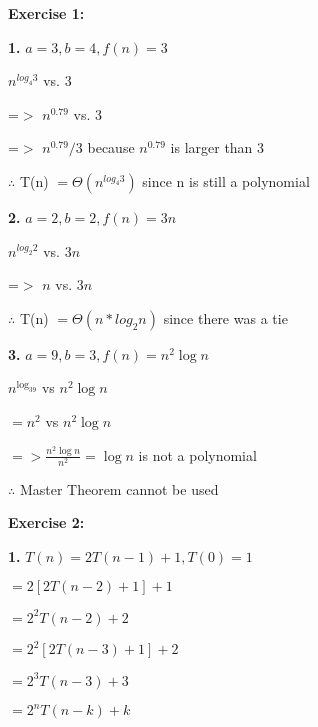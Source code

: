 \documentclass[12pt,letterpaper,final]{report}
\begin{document}
\vline


\noindent\textbf{Exercise 1:}  

\bigskip


\textbf{1.} $a=3, b=4, f(n) = 3$

\quad $n^{log_4 3}$  vs.  $3$

\quad =$>$ $n^{0.79}$  vs.  $3$

\quad =$>$ $n^{0.79} / 3$ because $n^{0.79}$ is larger than 3

\quad  $\therefore$ T(n) $= \Theta (n^{log_4 3})$ since n is still a polynomial




\bigskip

\textbf{2.} $a=2, b=2, f(n) = 3n$

\quad $n^{log_2 2}$  vs.  $3n$

\quad =$>$ $n$  vs.  $3n$

\quad $\therefore$ T(n) $= \Theta (n*log_2 n)$ since there was a tie

\bigskip

\textbf{3.} $a = 9, b = 3, f(n) = n^2\log n$

\quad $n^{\log_39}$ vs $n^2\log n$ 

\quad $= n^2$ vs $n^2\log n$

\quad $=> \frac{n^2\log n}{n^2} = \log n$ is not a polynomial 

\quad $\therefore$ Master Theorem cannot be used


\bigskip



\noindent\textbf{Exercise 2:} 

\bigskip


\textbf{1.} $T(n) = 2T(n-1) + 1, T(0) = 1$

\quad $= 2[2T(n - 2) + 1] + 1$

\quad $= 2^2T(n-2)+2$

\quad $= 2^2[2T(n-3)+1]+2$

\quad $= 2^3T(n-3)+3$

\quad $ = 2^n T(n-k) + k$
\end{document}
